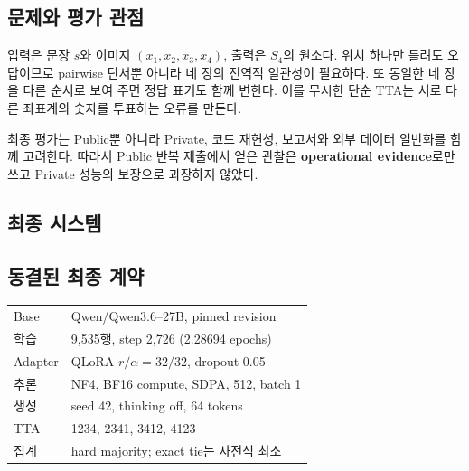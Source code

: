 \documentclass[9pt,a4paper]{extarticle}
\begin{document}
\vspace{3pt}
\begin{multicols}{2}
\section{문제와 평가 관점}

입력은 문장 $s$와 이미지 $(x_1,x_2,x_3,x_4)$, 출력은
$S_4$의 원소다. 위치 하나만 틀려도 오답이므로 pairwise 단서뿐 아니라 네 장의
전역적 일관성이 필요하다. 또 동일한 네 장을 다른 순서로 보여 주면 정답 표기도
함께 변한다. 이를 무시한 단순 TTA는 서로 다른 좌표계의 숫자를 투표하는 오류를
만든다.

최종 평가는 Public뿐 아니라 Private, 코드 재현성, 보고서와 외부 데이터
일반화를 함께 고려한다. 따라서 Public 반복 제출에서 얻은 관찰은
\textbf{operational evidence}로만 쓰고 Private 성능의 보장으로 과장하지 않았다.

\subsection*{최종 시스템}
\begin{center}
\end{center}

\subsection*{동결된 최종 계약}
\begin{tabularx}{\linewidth}{@{}lY@{}}
\toprule
Base & Qwen/Qwen3.6--27B, pinned revision\\
학습 & 9,535행, step 2,726 (2.28694 epochs)\\
Adapter & QLoRA $r/\alpha=32/32$, dropout 0.05\\
추론 & NF4, BF16 compute, SDPA, 512, batch 1\\
생성 & seed 42, thinking off, 64 tokens\\
TTA & 1234, 2341, 3412, 4123\\
집계 & hard majority; exact tie는 사전식 최소\\
\bottomrule
\end{tabularx}


\end{multicols}
\end{document}
